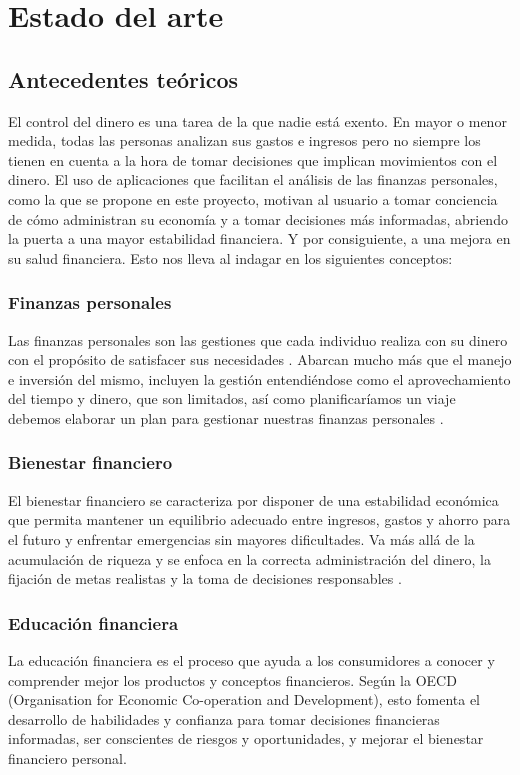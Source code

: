 \chapter{Estado del arte}

\section{Antecedentes teóricos}

El control del dinero es una tarea de la que nadie está exento. En mayor o menor 
medida, todas las personas analizan sus gastos e ingresos pero no siempre los tienen en 
cuenta a la hora de tomar decisiones que implican movimientos con el dinero. El uso de 
aplicaciones que facilitan el análisis de las finanzas personales, como la que se propone 
en este proyecto,  motivan al usuario a tomar conciencia de cómo administran su economía 
y a tomar decisiones más informadas, abriendo la puerta a una mayor estabilidad financiera. 
Y por consiguiente, a una mejora en su salud financiera. Esto nos lleva al indagar 
en los siguientes conceptos:

\subsection*{Finanzas personales}
Las finanzas personales son las gestiones que cada individuo realiza con su dinero 
con el propósito de satisfacer sus necesidades \cite{tesis-bienestar-financiero}.
Abarcan mucho más que el manejo e inversión del mismo, incluyen la gestión  
entendiéndose como el aprovechamiento del tiempo y dinero, que son limitados, así 
como planificaríamos un viaje debemos elaborar un plan para gestionar nuestras 
finanzas personales \cite{tyson2023personal}. 

\subsection*{Bienestar financiero}
El bienestar financiero se caracteriza por disponer de una estabilidad económica que 
permita mantener un equilibrio adecuado entre ingresos, gastos y ahorro para el futuro 
y enfrentar emergencias sin mayores dificultades. Va más allá de la acumulación de 
riqueza y se enfoca en la correcta administración del dinero, la fijación de metas 
realistas y la toma de decisiones responsables \cite{tesis-cultura-financiera}.

\subsection*{Educación financiera}
La educación financiera es el proceso que ayuda a los consumidores a conocer y 
comprender mejor los productos y conceptos financieros. Según la OECD (Organisation 
for Economic Co-operation and Development), esto fomenta el 
desarrollo de habilidades y confianza para tomar decisiones financieras informadas, ser 
conscientes de riesgos y oportunidades, y mejorar el bienestar financiero personal.

